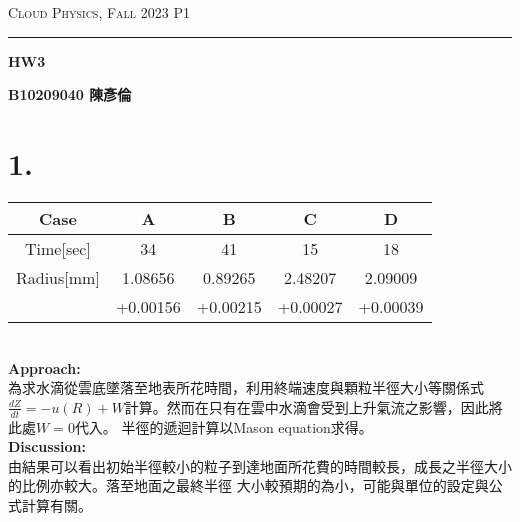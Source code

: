 \documentclass{article}
\author{B10209040 陳彥倫}
\begin{document}
\thispagestyle{empty}
\hfill {\scshape \large Cloud Physics, Fall 2023 } \hfill {\scshape P1}
\smallskip
\hrule
\begin{CJK*}{UTF8}{bsmi}
\bigskip
\bigskip
\bigskip

\centerline{\huge \textbf {HW3}}
\bigskip
\centerline{\textbf {B10209040 陳彥倫}}

\section*{1.}

\begin{center}
    \begin{adjustbox}{width=150mm,center}
        \begin{tabular}{||c|c | c | c | c ||} 
            \hline
            Case & A & B & C & D \\ [1ex] 
            \hline\hline
            Time[sec] & 34 & 41 & 15 & 18 \\ [1ex] 
            \hline
            Radius[mm] & 1.08656 & 0.89265 & 2.48207 & 2.09009 \\ [1ex] 
            \hline
                    & +0.00156 & +0.00215 & +0.00027 & +0.00039 \\ [1ex] 
            \hline
        \end{tabular}
    \end{adjustbox}
\end{center}

\begin{spacing}{2}
    \begin{large}
        \: \\
        \textbf{Approach:} \\
        為求水滴從雲底墜落至地表所花時間，利用終端速度與顆粒半徑大小等關係式\\
        $\frac{dZ}{dt} = -u(R) + W$計算。然而在只有在雲中水滴會受到上升氣流之影響，因此將此處$W = 0$代入。
        半徑的遞迴計算以Mason equation求得。\\
        \textbf{Discussion:} \\
        由結果可以看出初始半徑較小的粒子到達地面所花費的時間較長，成長之半徑大小的比例亦較大。落至地面之最終半徑
        大小較預期的為小，可能與單位的設定與公式計算有關。

        
        

        
    \end{large}
\end{spacing}

\end{CJK*}
\end{document}
